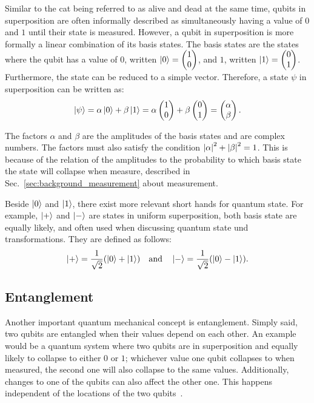 Similar to the cat being referred to as alive and dead at the same time, qubits in superposition are often informally described as simultaneously having a value of $0$ and $1$ until their state is measured. However, a qubit in superposition is more formally a linear combination of its basis states. The basis states are the states where the qubit has a value of $0$, written $\ket{0} = \begin{pmatrix} 1 \\ 0 \end{pmatrix}$, and $1$, written $\ket{1} = \begin{pmatrix} 0 \\ 1 \end{pmatrix}$.
Furthermore, the state can be reduced to a simple vector. Therefore, a state $\psi$ in superposition can be written as:
\begin{equation*}
    \ket{\psi} = \alpha \ket{0} + \beta \ket{1} = \alpha \begin{pmatrix} 1 \\ 0 \end{pmatrix} + \beta \begin{pmatrix} 0 \\ 1 \end{pmatrix} = \begin{pmatrix} \alpha \\ \beta \end{pmatrix}.
\end{equation*}

The factors $\alpha$ and $\beta$ are the amplitudes of the basis states and are complex numbers. The factors must also satisfy the condition $\abs{\alpha}^2 + \abs{\beta}^2 = 1$. This is because of the relation of the amplitudes to the probability to which basis state the state will collapse when measure, described in Sec.~\ref{sec:background_measurement} about measurement.

Beside $\ket{0}$ and $\ket{1}$, there exist more relevant short hands for quantum state. For example, $\ket{+}$ and $\ket{-}$ are states in uniform superposition, \ie both basis state are equally likely, and often used when discussing quantum state und transformations. They are defined as follows:
\begin{equation*}
    \ket{+} = \frac{1}{\sqrt{2}} (\ket{0} + \ket{1}) \quad  \text{and}  \quad \ket{-} = \frac{1}{\sqrt{2}} (\ket{0} - \ket{1}).
\end{equation*}

\subsection{Entanglement}
Another important quantum mechanical concept is entanglement. Simply said, two qubits are entangled when their values depend on each other. An example would be a quantum system where two qubits are in superposition and equally likely to collapse to either $0$ or $1$; whichever value one qubit collapses to when measured, the second one will also collapse to the same values.
Additionally, changes to one of the qubits can also affect the other one. This happens independent of the locations of the two qubits~\cite{RDB*22, HHHH09}.

